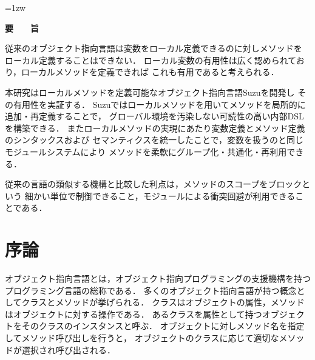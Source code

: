 \documentclass[a4paper,11pt,dvipdfmx]{jreport}
\title{\Underline{レキシカル環境にメソッドを定義する\\オブジェクト指向言語Suzu}}
\author{林 拓人}
\begin{document}
\maketitle
\thispagestyle{empty}
\newpage

\thispagestyle{empty}
\vspace*{20pt plus 1fil}
\parindent=1zw
\noindent
\begin{center}
{\Large \bf 要　　旨}
\vspace{2cm}
\end{center}

従来のオブジェクト指向言語は変数をローカル定義できるのに対しメソッドを
ローカル定義することはできない．
ローカル変数の有用性は広く認められており，ローカルメソッドを定義できれば
これも有用であると考えられる．

本研究はローカルメソッドを定義可能なオブジェクト指向言語Suzuを開発し
その有用性を実証する．
Suzuではローカルメソッドを用いてメソッドを局所的に追加・再定義することで，
グローバル環境を汚染しない可読性の高い内部DSLを構築できる．
またローカルメソッドの実現にあたり変数定義とメソッド定義のシンタックスおよび
セマンティクスを統一したことで，変数を扱うのと同じモジュールシステムにより
メソッドを柔軟にグループ化・共通化・再利用できる．

従来の言語の類似する機構と比較した利点は，メソッドのスコープをブロックという
細かい単位で制御できること，モジュールによる衝突回避が利用できることである．

\par
\vspace{0pt plus 1fil}
\newpage

\tableofcontents

\pagebreak \setcounter{page}{1}


\chapter{序論}

オブジェクト指向言語とは，オブジェクト指向プログラミングの支援機構を持つ
プログラミング言語の総称である．
多くのオブジェクト指向言語が持つ概念としてクラスとメソッドが挙げられる．
クラスはオブジェクトの属性，メソッドはオブジェクトに対する操作である．
あるクラスを属性として持つオブジェクトをそのクラスのインスタンスと呼ぶ．
オブジェクトに対しメソッド名を指定してメソッド呼び出しを行うと，
オブジェクトのクラスに応じて適切なメソッドが選択され呼び出される．
\end{document}
